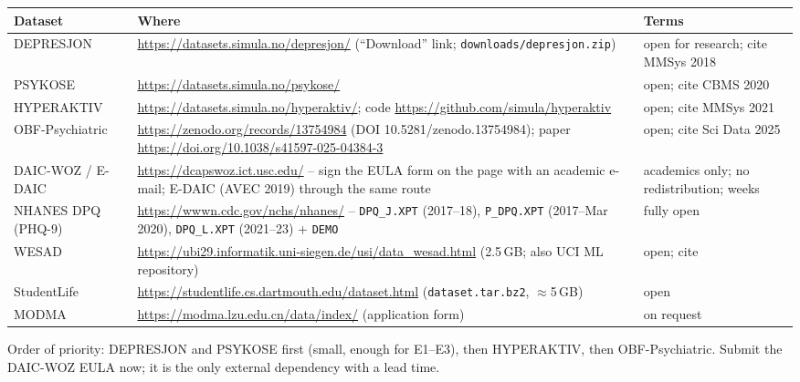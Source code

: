 \documentclass[11pt,a4paper]{article}
\begin{document}
\begin{footnotesize}
\begin{tabularx}{\linewidth}{@{}>{\RaggedRight}p{2.6cm} L >{\RaggedRight}p{2.6cm}@{}}
\toprule
\textbf{Dataset} & \textbf{Where} & \textbf{Terms}\\
\midrule
DEPRESJON & \url{https://datasets.simula.no/depresjon/} (``Download'' link; \texttt{downloads/depresjon.zip}) & open for research; cite MMSys 2018\\
PSYKOSE & \url{https://datasets.simula.no/psykose/} & open; cite CBMS 2020\\
HYPERAKTIV & \url{https://datasets.simula.no/hyperaktiv/}; code \url{https://github.com/simula/hyperaktiv} & open; cite MMSys 2021\\
OBF-Psychiatric & \url{https://zenodo.org/records/13754984} (DOI 10.5281/zenodo.13754984); paper \url{https://doi.org/10.1038/s41597-025-04384-3} & open; cite Sci Data 2025\\
DAIC-WOZ / E-DAIC & \url{https://dcapswoz.ict.usc.edu/} -- sign the EULA form on the page with an academic e-mail; E-DAIC (AVEC 2019) through the same route & academics only; no redistribution; weeks\\
NHANES DPQ (PHQ-9) & \url{https://wwwn.cdc.gov/nchs/nhanes/} -- \texttt{DPQ\_J.XPT} (2017--18), \texttt{P\_DPQ.XPT} (2017--Mar 2020), \texttt{DPQ\_L.XPT} (2021--23) + \texttt{DEMO} & fully open\\
WESAD & \url{https://ubi29.informatik.uni-siegen.de/usi/data_wesad.html} (2.5\,GB; also UCI ML repository) & open; cite\\
StudentLife & \url{https://studentlife.cs.dartmouth.edu/dataset.html} (\texttt{dataset.tar.bz2}, $\approx$5\,GB) & open\\
MODMA & \url{https://modma.lzu.edu.cn/data/index/} (application form) & on request\\
\bottomrule
\end{tabularx}
\end{footnotesize}

Order of priority: DEPRESJON and PSYKOSE first (small, enough for E1--E3), then HYPERAKTIV, then
OBF-Psychiatric. Submit the DAIC-WOZ EULA now; it is the only external dependency with a lead time.
\end{document}
